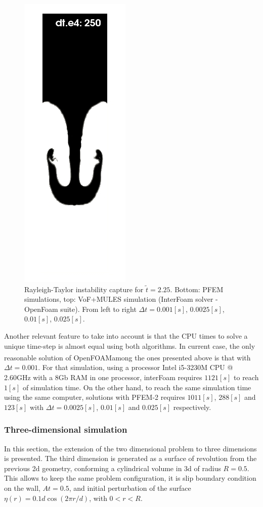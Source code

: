 \documentclass[a4paper,conference]{IEEEtran}
\newcommand{\OF}{OpenFOAM\textsuperscript{\textregistered}}
\begin{document}
\begin{figure}
\begin{center}
      \includegraphics[width=.24\columnwidth]{images/rayleigh_pfem_dts_D.jpg}

  \end{center}
  \caption{\label{fg:rayleigh-comparison-dts} Rayleigh-Taylor instability capture for $\widetilde{t}=2.25$. Bottom: PFEM simulations, top: VoF+MULES simulation (InterFoam solver - OpenFoam suite). From left to right $\Delta t =0.001[s]$, $0.0025[s]$, $0.01[s]$, $0.025[s]$.}
\end{figure}

Another relevant feature to take into account is that the CPU times to solve a unique time-step is almost equal using both algorithms.
In current case,  the only reasonable solution of \OF among the ones presented above is that with $\Delta t=0.001$. For that simulation, using a processor Intel i5-3230M CPU @ 2.60GHz with a 8Gb RAM in one processor, interFoam requires $1121[s]$ to reach $1[s]$ of simulation time. On the other hand, to reach the same simulation time using the same computer, solutions with PFEM-2 requires $1011[s]$, $288[s]$ and $123[s]$ with $\Delta t=0.0025[s]$, $0.01[s]$ and $0.025[s]$ respectively.




\subsubsection{Three-dimensional simulation}

In this section, the extension of the two dimensional problem to three dimensions is presented. The third dimension is generated as a surface of revolution from the previous 2d geometry, conforming a cylindrical volume in 3d of radius $R=0.5$. This allows to keep the same problem configuration, it is slip boundary condition on the wall, $At=0.5$, and initial perturbation of the surface $\eta(r) = 0.1d \cos(2\pi r/d)$, with $0<r<R$.
\end{document}
